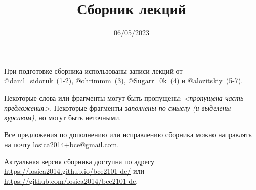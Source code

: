 

\title{Сборник лекций}
\date{06/05/2023}
\author{}
\email{}

\def \missed{\textit{<пропущена часть предложения>}}

\usepackage{multienum}
\newtheorem{definition}{Определение}



\maketitle

При подготовке сборника использованы записи лекций от\\@danil\_sidoruk~(1-2), @ohrimmm~(3), @Sugarr\_0k~(4) и @alozitskiy~(5-7).

Некоторые слова или фрагменты могут быть пропущены: \missed{}.
Некоторые фрагменты \textit{заполнены по смыслу (и выделены курсивом)}, но могут быть неточными.

Все предложения по дополнению или исправлению сборника можно направлять на почту \href{mailto:losica2014+bce@gmail.com?subject=%D0%94%D0%BE%D0%BF%D0%BE%D0%BB%D0%BD%D0%B5%D0%BD%D0%B8%D0%B5%20%D0%BA%20%D1%81%D0%B1%D0%BE%D1%80%D0%BD%D0%B8%D0%BA%D1%83%20%D0%BB%D0%B5%D0%BA%D1%86%D0%B8%D0%B9%20(%D0%AD%D0%94%D0%9E)&body=%D0%9E%D0%BF%D0%B8%D1%88%D0%B8%D1%82%D0%B5%20%D0%B7%D0%B4%D0%B5%D1%81%D1%8C%2C%20%D1%87%D1%82%D0%BE%20%D0%B2%D1%8B%20%D1%85%D0%BE%D1%82%D0%B8%D1%82%D0%B5%20%D0%B4%D0%BE%D0%BF%D0%BE%D0%BB%D0%BD%D0%B8%D1%82%D1%8C%20%D0%B8%D0%BB%D0%B8%20%D0%B8%D1%81%D0%BF%D1%80%D0%B0%D0%B2%D0%B8%D1%82%D1%8C.%20%D0%A3%D0%BA%D0%B0%D0%B6%D0%B8%D1%82%D0%B5%20%D1%82%D0%B5%D0%BC%D1%83%2C%20%D0%BC%D0%B5%D1%81%D1%82%D0%BE%20(%D0%BD%D0%BE%D0%BC%D0%B5%D1%80%20%D1%80%D0%B0%D0%B7%D0%B4%D0%B5%D0%BB%D0%B0)%20%D0%B8%20%D0%B2%D0%B0%D1%88%D0%B5%20%D0%B8%D1%81%D0%BF%D1%80%D0%B0%D0%B2%D0%BB%D0%B5%D0%BD%D0%B8%D0%B5.%20%D0%9F%D0%BE%20%D0%B2%D0%BE%D0%B7%D0%BC%D0%BE%D0%B6%D0%BD%D0%BE%D1%81%D1%82%D0%B8%20%D0%BF%D1%80%D0%BE%D0%BA%D0%BE%D0%BC%D0%BC%D0%B5%D0%BD%D1%82%D0%B8%D1%80%D1%83%D0%B9%D1%82%D0%B5%2C%20%D0%BF%D0%BE%D1%87%D0%B5%D0%BC%D1%83%20%D0%B2%D1%8B%20%D1%85%D0%BE%D1%82%D0%B8%D1%82%D0%B5%20%D1%82%D0%B0%D0%BA%20%D1%81%D0%B4%D0%B5%D0%BB%D0%B0%D1%82%D1%8C.}{losica2014+bce@gmail.com}.

Актуальная версия сборника доступна по адресу \url{https://losica2014.github.io/bce2101-dc/} или \url{https://github.com/losica2014/bce2101-dc}.

